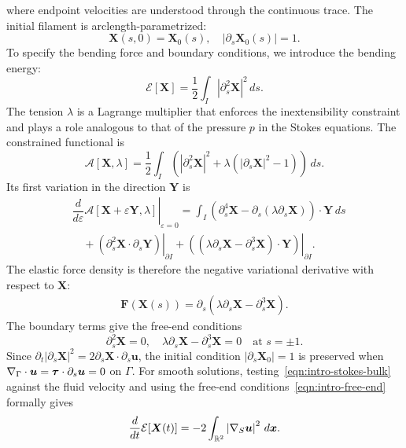 \documentclass[11pt,reqno]{amsart}
\theoremstyle{plain}
\theoremstyle{definition}
\numberwithin{equation}{section}
\newcommand{\paren}[1]{\left(#1\right)}
\newcommand{\p}{\partial}
\newcommand{\at}[2]{\left. #1 \right|_{#2}}
\newcommand{\grad}[1]{\nabla #1}
\newcommand{\mc}[1]{\mathcal{#1}}
\newcommand{\bm}[1]{\boldsymbol{#1}}
\newcommand{\abs}[1]{\left\lvert #1 \right\rvert}
\newcommand{\R}{\mathbb{R}}
\begin{document}
where endpoint velocities are understood through the continuous trace.
The initial filament is arclength-parametrized:
\begin{equation}\label{eqn:intro-initial}
    \bm X(s,0)=\bm X_0(s),
    \quad \abs{\p_s\bm X_0(s)}=1.
\end{equation}
To specify the bending force and boundary conditions, we introduce the bending energy:
\begin{equation}
    \mc E[\bm X]
    =\frac{1}{2}\int_I |\p_s^2\bm X|^2\,ds.
\end{equation}
The tension $\lambda$ is a Lagrange multiplier that enforces the inextensibility constraint and plays a role analogous to that of the pressure $p$ in the Stokes equations.
The constrained functional is
\begin{equation}
    \mc A[\bm X,\lambda]
    =\frac{1}{2}\int_I
    \left(|\p_s^2\bm X|^2
    +\lambda\paren{|\p_s\bm X|^2-1}\right)\,ds.
\end{equation}
Its first variation in the direction $\bm Y$ is
\begin{equation}
\begin{aligned}
    &
    \at{\dfrac{d}{d\varepsilon}
    \mc A[\bm X+\varepsilon\bm Y,\lambda]}{\varepsilon=0}
    = \int_I \paren{\p_s^4\bm X
    -\p_s\paren{\lambda\p_s\bm X}}\cdot\bm Y\,ds \\
    &\quad
    + \at{\paren{\p_s^2\bm X\cdot\p_s\bm Y}}{\p I}
    + \at{\paren{\paren{\lambda\p_s\bm X-\p_s^3\bm X}
    \cdot\bm Y}}{\p I}.
\end{aligned}
\end{equation}
The elastic force density is therefore the negative variational derivative
with respect to $\bm X$:
\begin{equation}\label{eqn:bending-force}
\begin{aligned}
    \bm F(\bm X(s))=\p_s\paren{\lambda\p_s\bm X  -\p_s^3\bm X }.
\end{aligned}
\end{equation}
The boundary terms give the free-end conditions
\begin{equation}\label{eqn:intro-free-end}
    \p_s^2\bm X=0,
    \quad \lambda\p_s\bm X-\p_s^3\bm X=0
    \quad\text{at }s=\pm1.
\end{equation}
Since $\p_t\abs{\p_s\bm X}^2=2\p_s\bm X\cdot\p_s\bm u$, the initial
condition $\abs{\p_s\bm X_0}=1$ is preserved when
$\grad_\Gamma\cdot\bm u=\bm\tau\cdot\p_s\bm u=0$ on $\Gamma$.
For smooth solutions, testing~\eqref{eqn:intro-stokes-bulk} against the fluid velocity
and using the free-end conditions~\eqref{eqn:intro-free-end} formally gives
\begin{equation}\label{eqn:energy-law}
    \frac{d}{dt} \mc E[\bm X(t)]
    = - 2\int_{\R^2} \abs{\grad_S \bm u}^2 \,d\bm x.
\end{equation}
\end{document}
